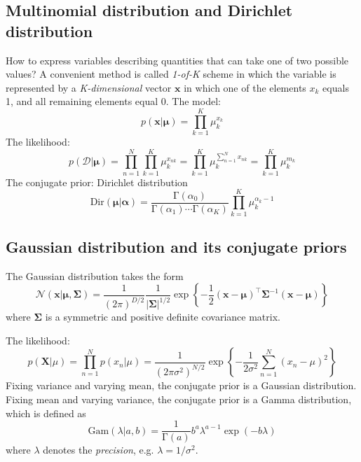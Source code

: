 \documentclass[a4paper]{book}
\newcommand{\up}{\mathrm}
\renewcommand{\bf}{\mathbf}
\renewcommand{\cal}{\mathcal}
\newcommand{\imp}[1]{\textit{#1}}
\begin{document}
\subsection{Multinomial distribution and Dirichlet distribution}
How to express variables describing quantities that can take one of two possible values? A convenient method is called \imp{1-of-K} scheme in which the variable is represented by a \emph{K-dimensional} vector $\bf{x}$ in which one of the elements $x_k$ equals 1, and all remaining elements equal 0.
The model:
\begin{equation}
	p(\bf{x}|\boldsymbol\mu)=\prod_{k=1}^{K}\mu_{k}^{x_k}
\end{equation}
The likelihood:
\begin{equation}
	p(\cal{D}|\boldsymbol\mu)=\prod_{n=1}^{N}\prod_{k=1}^{K}\mu_k^{x_{nk}}=\prod_{k=1}^{K}\mu_{k}^{\sum_{n=1}^{N}x_{nk}}=\prod_{k=1}^{K}\mu_{k}^{m_k}
\end{equation}
The conjugate prior: Dirichlet distribution
\begin{equation}
	\up{Dir}(\boldsymbol\mu|\boldsymbol\alpha)=\frac{\up{\Gamma}(\alpha_0)}{\up{\Gamma}(\alpha_1)\cdots\up{\Gamma}(\alpha_K)}\prod_{k=1}^{K}\mu_{k}^{\alpha_k-1}
\end{equation}
\subsection{Gaussian distribution and its conjugate priors}
The Gaussian distribution takes the form
\begin{equation}
	\cal{N}(\bf{x}|\boldsymbol{\mu,\Sigma})=\frac{1}{(2\pi)^{D/2}}\frac{1}{|\boldsymbol{\Sigma}|^{1/2}}\exp\left\lbrace-\frac{1}{2}(\bf{x}-\boldsymbol{\mu})^{\intercal}\boldsymbol{\Sigma}^{-1}(\bf{x}-\boldsymbol{\mu}) \right\rbrace 
\end{equation}
where $\boldsymbol{\Sigma}$ is a symmetric and positive definite covariance matrix. 

The likelihood:
\begin{equation}
	p(\bf{X}|\mu)=\prod_{n=1}^{N}p(x_n|\mu)=\frac{1}{(2\pi \sigma^2)^{N/2}}\exp\left\lbrace-\frac{1}{2\sigma^2}\sum_{n=1}^{N}(x_n-\mu)^2\right\rbrace
\end{equation}
Fixing variance and varying mean, the conjugate prior is a Gaussian distribution. Fixing mean and varying variance, the conjugate prior is a Gamma distribution, which is defined as
\begin{equation}
	\up{Gam}(\lambda|a,b)=\frac{1}{\up{\Gamma}(a)}b^a \lambda^{a-1}\exp(-b\lambda)
\end{equation}
where $\lambda$ denotes the \emph{precision}, e.g. $\lambda = 1/\sigma^2$.
\end{document}
